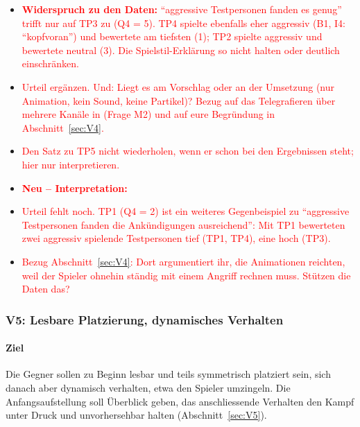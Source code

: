 \documentclass[../Main.tex]{subfiles}
\begin{document}
\begin{itemize}[leftmargin=1.5cm]
    \item \textcolor{red}{\textbf{Widerspruch zu den Daten:} \enquote{aggressive Testpersonen fanden es genug} trifft nur auf TP3 zu (Q4 = 5). TP4 spielte ebenfalls eher aggressiv (B1, I4: \enquote{kopfvoran}) und bewertete am tiefsten (1); TP2 spielte aggressiv und bewertete neutral (3). Die Spielstil-Erklärung so nicht halten oder deutlich einschränken.}
    \item \textcolor{red}{Urteil ergänzen. Und: Liegt es am Vorschlag oder an der Umsetzung (nur Animation, kein Sound, keine Partikel)? Bezug auf das Telegrafieren über mehrere Kanäle in  (Frage M2) und auf eure Begründung in Abschnitt~\ref{sec:V4}.}
    \item \textcolor{red}{Den Satz zu TP5 nicht wiederholen, wenn er schon bei den Ergebnissen steht; hier nur interpretieren.}
\end{itemize}

\begin{itemize}[leftmargin=1.5cm]
    \item \textcolor{red}{\textbf{Neu -- Interpretation:}}
    \item \textcolor{red}{Urteil fehlt noch. TP1 (Q4 = 2) ist ein weiteres Gegenbeispiel zu \enquote{aggressive Testpersonen fanden die Ankündigungen ausreichend}: Mit TP1 bewerteten zwei aggressiv spielende Testpersonen tief (TP1, TP4), eine hoch (TP3).}
    \item \textcolor{red}{Bezug Abschnitt~\ref{sec:V4}: Dort argumentiert ihr, die Animationen reichten, weil der Spieler ohnehin ständig mit einem Angriff rechnen muss. Stützen die Daten das?}
\end{itemize}

\subsubsection{V5: Lesbare Platzierung, dynamisches Verhalten}

\paragraph{Ziel}
Die Gegner sollen zu Beginn lesbar und teils symmetrisch platziert sein, sich danach aber dynamisch verhalten, etwa den Spieler umzingeln. Die Anfangsaufstellung soll Überblick geben, das anschliessende Verhalten den Kampf unter Druck und unvorhersehbar halten (Abschnitt~\ref{sec:V5}).
\end{document}

